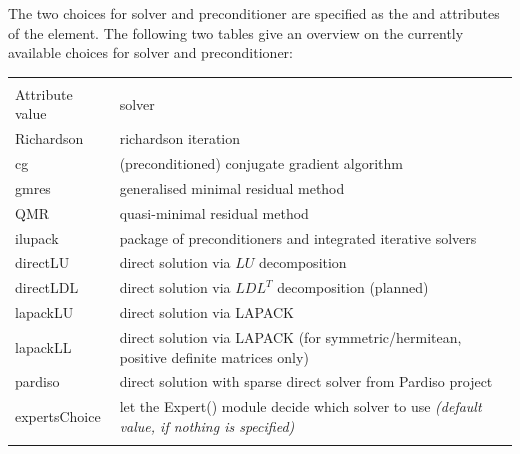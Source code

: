 The two choices for solver and preconditioner are specified as the 
and  attributes of the  element. The following two
tables give an overview on the currently available choices for solver and
preconditioner:
%
%
\begin{center}
\begin{tabular}{lp{}}
\hline\noalign{\smallskip}
\multicolumn{2}{c}{Currently available choices for \xml{type} attribute of
\xml{solver} element}\\
\noalign{\smallskip}\hline\noalign{\smallskip}
Attribute value & solver\\
\noalign{\smallskip}\hline\noalign{\smallskip}
Richardson    & richardson iteration\\
cg	      & (preconditioned) conjugate gradient algorithm\\
gmres	      & generalised minimal residual method\\
QMR	      & quasi-minimal residual method\\
ilupack       & package of preconditioners and integrated iterative solvers\\
\noalign{\smallskip}\hline\noalign{\smallskip}
directLU      & direct solution via $LU$ decomposition\\
directLDL     & direct solution via $LDL^T$ decomposition (planned)\\
lapackLU      & direct solution via LAPACK\\
lapackLL      & direct solution via LAPACK (for symmetric/hermitean, positive
                definite matrices only)\\
pardiso       & direct solution with sparse direct solver from Pardiso
                project\\
\noalign{\smallskip}\hline\noalign{\smallskip}
expertsChoice & let the Expert() module decide which solver to use
                \emph{(default value, if nothing is specified)}\\
\noalign{\smallskip}\hline
\end{tabular}
\end{center}
%
%
